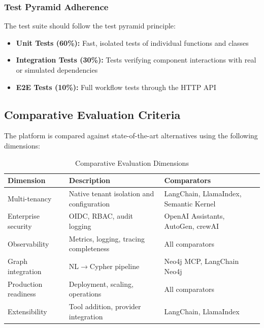 \subsubsection{Test Pyramid Adherence}

The test suite should follow the test pyramid principle:
\begin{itemize}
    \item \textbf{Unit Tests (60\%):} Fast, isolated tests of individual functions and classes
    \item \textbf{Integration Tests (30\%):} Tests verifying component interactions with real or simulated dependencies
    \item \textbf{E2E Tests (10\%):} Full workflow tests through the HTTP API
\end{itemize}

\subsection{Comparative Evaluation Criteria}
\label{subsec:comparative-criteria}

The platform is compared against state-of-the-art alternatives using the following dimensions:

\begin{table}[htbp]
\centering
\caption{Comparative Evaluation Dimensions}
\label{tab:comparative-eval}
\small
\begin{tabularx}{\textwidth}{|l|X|l|}
\hline
\textbf{Dimension} & \textbf{Description} & \textbf{Comparators} \\
\hline
Multi-tenancy & Native tenant isolation and configuration & LangChain, LlamaIndex, Semantic Kernel \\
\hline
Enterprise security & OIDC, RBAC, audit logging & OpenAI Assistants, AutoGen, crewAI \\
\hline
Observability & Metrics, logging, tracing completeness & All comparators \\
\hline
Graph integration & NL$\rightarrow$Cypher pipeline & Neo4j MCP, LangChain Neo4j \\
\hline
Production readiness & Deployment, scaling, operations & All comparators \\
\hline
Extensibility & Tool addition, provider integration & LangChain, LlamaIndex \\
\hline
\end{tabularx}
\end{table}

